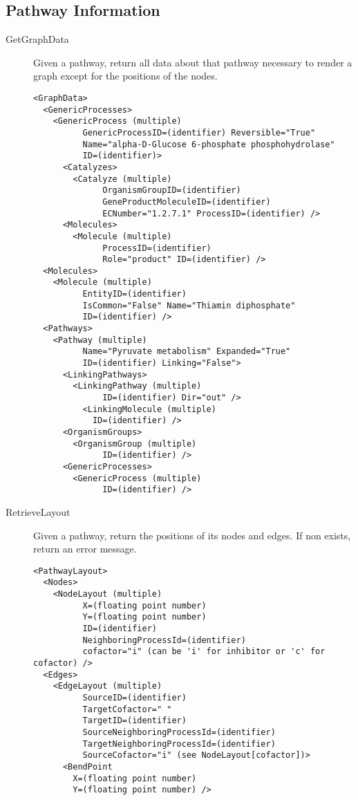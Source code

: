 \subsection{Pathway Information}
\begin{description}
    \item[GetGraphData] Given a pathway, return all data about that pathway
    necessary to render a graph except for the positions of the nodes.

    \begin{lstlisting}
<GraphData>
  <GenericProcesses>
    <GenericProcess (multiple)
          GenericProcessID=(identifier) Reversible="True"
          Name="alpha-D-Glucose 6-phosphate phosphohydrolase"
          ID=(identifier)>
      <Catalyzes>
        <Catalyze (multiple)
              OrganismGroupID=(identifier)
              GeneProductMoleculeID=(identifier)
              ECNumber="1.2.7.1" ProcessID=(identifier) />
      <Molecules>
        <Molecule (multiple)
              ProcessID=(identifier)
              Role="product" ID=(identifier) />
  <Molecules>
    <Molecule (multiple)
          EntityID=(identifier)
          IsCommon="False" Name="Thiamin diphosphate"
          ID=(identifier) />
  <Pathways>
    <Pathway (multiple)
          Name="Pyruvate metabolism" Expanded="True"
          ID=(identifier) Linking="False">
      <LinkingPathways>
        <LinkingPathway (multiple)
              ID=(identifier) Dir="out" />
          <LinkingMolecule (multiple)
            ID=(identifier) />
      <OrganismGroups>
        <OrganismGroup (multiple)
              ID=(identifier) />
      <GenericProcesses>
        <GenericProcess (multiple)
              ID=(identifier) />
    \end{lstlisting}

    \item[RetrieveLayout] Given a pathway, return the positions of its nodes
    and edges. If non exists, return an error message.

    \begin{lstlisting}
<PathwayLayout>
  <Nodes>
    <NodeLayout (multiple)
          X=(floating point number)
          Y=(floating point number)
          ID=(identifier)
          NeighboringProcessId=(identifier)
          cofactor="i" (can be 'i' for inhibitor or 'c' for cofactor) />
  <Edges>
    <EdgeLayout (multiple)
          SourceID=(identifier)
          TargetCofactor=" "
          TargetID=(identifier)
          SourceNeighboringProcessId=(identifier)
          TargetNeighboringProcessId=(identifier)
          SourceCofactor="i" (see NodeLayout[cofactor])>
      <BendPoint
        X=(floating point number)
        Y=(floating point number) />
    

\end{lstlisting}
\end{description}
